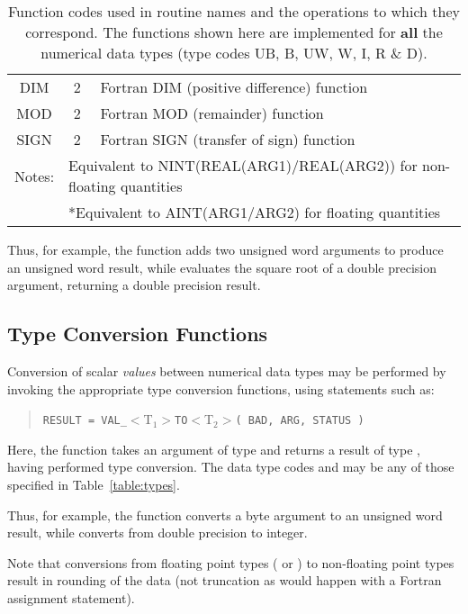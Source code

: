 \begin{table}
\begin{center}
\begin{tabular}{|c|c|l|}
DIM & 2 & Fortran DIM (positive difference) function \\
MOD & 2 & Fortran MOD (remainder) function \\
SIGN & 2 & Fortran SIGN (transfer of sign) function \\
\hline
\multicolumn{1}{|r}{\footnotesize Notes:} &
\multicolumn{2}{l|}{\footnotesize *Equivalent to
NINT(REAL(ARG1)$/$REAL(ARG2)) for non-floating quantities} \\
\multicolumn{1}{|l}{} &
\multicolumn{2}{l|}{\footnotesize **Equivalent to AINT(ARG1$/$ARG2) for
floating quantities} \\
\hline
\end{tabular}
\caption{Function codes used in routine names and the operations to which they
correspond.
The functions shown here are implemented for {\bf all} the numerical data
types (type codes UB, B, UW, W, I, R \& D).}
\label{table:functions}
\end{center}
\end{table}

Thus, for example, the function  adds two unsigned word
arguments to produce an unsigned word result, while 
evaluates the square root of a double precision argument, returning a double
precision result.

\subsection{ Type Conversion Functions}

Conversion of scalar {\em values} between numerical data types may be
performed by invoking the appropriate  type conversion functions,
using statements such as:

\begin{quote}
\verb#RESULT = VAL_#$<$T$_{1}>$\verb#TO#$<$T$_{2}>$\verb#( BAD, ARG, STATUS )#
\end{quote}

Here, the  function takes an argument of type 
and returns a result of type , having performed type
conversion.
The data type codes  and  may be any of
those specified in Table~\ref{table:types}.

Thus, for example, the function  converts a byte argument
to an unsigned word result, while  converts from double
precision to integer.

Note that conversions from floating point types ( or
) to non-floating point types result in rounding of the data
(not truncation as would happen with a Fortran assignment statement).

